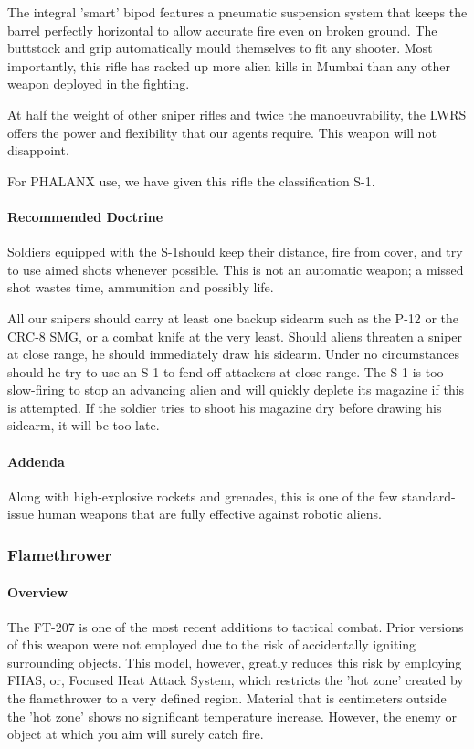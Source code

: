 The integral 'smart' bipod features a pneumatic suspension system that keeps the barrel perfectly horizontal to allow accurate fire even on broken ground. The buttstock and grip automatically mould themselves to fit any shooter. Most importantly, this rifle has racked up more alien kills in Mumbai than any other weapon deployed in the fighting.

At half the weight of other sniper rifles and twice the manoeuvrability, the LWRS offers the power and flexibility that our agents require. This weapon will not disappoint.

For PHALANX use, we have given this rifle the classification S-1.
\paragraph*{Recommended Doctrine}
Soldiers equipped with the S-1should keep their distance, fire from cover, and try to use aimed shots whenever possible. This is not an automatic weapon; a missed shot wastes time, ammunition and possibly life.

All our snipers should carry at least one backup sidearm such as the P-12 or the CRC-8 SMG, or a combat knife at the very least. Should aliens threaten a sniper at close range, he should immediately draw his sidearm. Under no circumstances should he try to use an S-1 to fend off attackers at close range. The S-1 is too slow-firing to stop an advancing alien and will quickly deplete its magazine if this is attempted. If the soldier tries to shoot his magazine dry before drawing his sidearm, it will be too late.
\paragraph*{Addenda}
Along with high-explosive rockets and grenades, this is one of the few standard-issue human weapons that are fully effective against robotic aliens.

\newpage

\subsubsection*{Flamethrower}
\paragraph*{Overview}
The FT-207 is one of the most recent additions to tactical combat. Prior versions of this weapon were not employed due to the risk of accidentally igniting surrounding objects. This model, however, greatly reduces this risk by employing FHAS, or, Focused Heat Attack System, which restricts the 'hot zone' created by the flamethrower to a very defined region. Material that is centimeters outside the 'hot zone' shows no significant temperature increase. However, the enemy or object at which you aim will surely catch fire.
